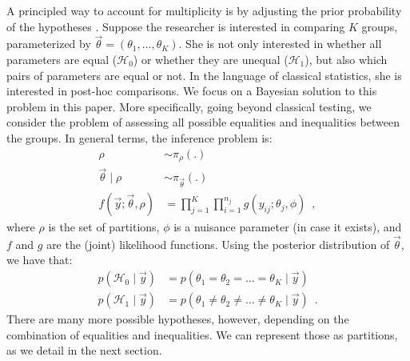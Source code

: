 \documentclass[11pt,a4paper]{article}
\theoremstyle{definition} %
\theoremstyle{case}
\begin{document}
A principled way to account for multiplicity is by adjusting the prior probability of the hypotheses \parencite[e.g.,][]{jeffreys1961theory, westfall1997bayesian}. Suppose the researcher is interested in comparing $K$ groups, parameterized by $\vec{\theta} = (\theta_1, \ldots, \theta_K)$. She is not only interested in whether all parameters are equal ($\mathcal{H}_0$) or whether they are unequal ($\mathcal{H}_1$), but also which pairs of parameters are equal or not. In the language of classical statistics, she is interested in post-hoc comparisons. We focus on a Bayesian solution to this problem in this paper. More specifically, going beyond classical testing, we consider the problem of assessing all possible equalities and inequalities between the groups. In general terms, the inference problem is:
\begin{align*}
    \rho &\sim \pi_{\rho}(.) \\
    \vec{\theta} \mid \rho &\sim \pi_{\vec{\theta}}(.) \\
    f(\vec{y}; \vec{\theta}, \rho) &= \prod_{j=1}^K \prod_{i=1}^{n_j} g(y_{ij}; \theta_j, \phi) \enspace ,
\end{align*}
where $\rho$ is the set of partitions, $\phi$ is a nuisance parameter (in case it exists), and $f$ and $g$ are the (joint) likelihood functions. Using the posterior distribution of $\vec{\theta}$, we have that:
\begin{align*}
    p(\mathcal{H}_0 \mid \vec{y}) &= p(\theta_1 = \theta_2 = \ldots = \theta_K \mid \vec{y}) \\
    p(\mathcal{H}_1 \mid \vec{y}) &= p(\theta_1 \neq \theta_2 \neq \ldots \neq \theta_K \mid \vec{y}) \enspace .
\end{align*}
There are many more possible hypotheses, however, depending on the combination of equalities and inequalities. We can represent those as partitions, as we detail in the next section. %
\end{document}
